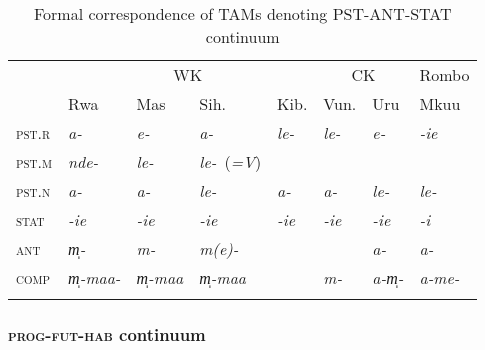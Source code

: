 \documentclass[output=paper]{langscibook}
\begin{document}
\begin{table}

\begin{tabularx}{\textwidth}{XXXXXXXX} 
\lsptoprule
& \multicolumn{4}{c}{WK} & \multicolumn{2}{c}{CK} & Rombo\\
\cmidrule(lr){2-5}\cmidrule(lr){6-7}\cmidrule(lr){8-8}
& Rwa & Mas & Sih. & Kib. & Vun. & Uru & Mkuu\\
\midrule
{\scshape pst.r} & {\itshape a-} & {\itshape e-} & {\itshape a-} & {\itshape le-} & {\itshape le-} & {\itshape e-} & {\itshape {}-ie}\\
{\scshape pst.m} & \textit{nde-} & {\itshape le-} & \mbox{\textit{le-} (\textit{=V})} &  &  &  & \\
{\scshape pst.n} & {\itshape a-} & {\itshape a-} & {\itshape le-} & {\itshape a-} & {\itshape a-} & {\itshape le-} & {\itshape le-}\\
{\scshape stat} & {\itshape {}-ie} & {\itshape {}-ie} & {\itshape {}-ie} & \textit{{}-ie} & {\itshape {}-ie} & {\itshape {}-ie} & {\itshape {}-i}\\
{\scshape ant} & {\itshape m̩-} & {\itshape m-} & {\itshape m(e)-} &  &  & {\itshape a-} & {\itshape a-}\\
{\scshape comp} & \mbox{\itshape m̩-maa-} & {\itshape m̩-maa} & {\itshape m̩-maa}  &  & {\itshape m-} & {\itshape a-m̩-} & {\itshape a-me-}\\
\lspbottomrule
\end{tabularx}
\caption{Formal correspondence of TAMs denoting PST-ANT-STAT continuum}
\label{tab:shinagawa:10}
\end{table}

\subsubsection{\textsc{prog}-\textsc{fut}-\textsc{hab} continuum}\label{sec:shinagawa:4.1.2}
\end{document}
